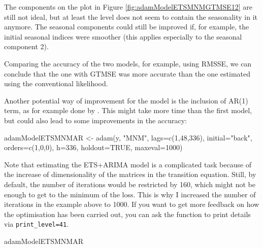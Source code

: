 \documentclass[
]{book}
\newenvironment{Shaded}{\begin{snugshade}}{\end{snugshade}}
\newcommand{\AttributeTok}[1]{\textcolor[rgb]{0.77,0.63,0.00}{#1}}
\newcommand{\ConstantTok}[1]{\textcolor[rgb]{0.00,0.00,0.00}{#1}}
\newcommand{\DecValTok}[1]{\textcolor[rgb]{0.00,0.00,0.81}{#1}}
\newcommand{\FunctionTok}[1]{\textcolor[rgb]{0.00,0.00,0.00}{#1}}
\newcommand{\NormalTok}[1]{#1}
\newcommand{\OtherTok}[1]{\textcolor[rgb]{0.56,0.35,0.01}{#1}}
\newcommand{\StringTok}[1]{\textcolor[rgb]{0.31,0.60,0.02}{#1}}
\theoremstyle{definition}
\theoremstyle{definition}
\theoremstyle{definition}
\theoremstyle{definition}
\theoremstyle{remark}
\begin{document}
The components on the plot in Figure \ref{fig:adamModelETSMNMGTMSE12} are still not ideal, but at least the level does not seem to contain the seasonality in it anymore. The seasonal components could still be improved if, for example, the initial seasonal indices were smoother (this applies especially to the seasonal component 2).

Comparing the accuracy of the two models, for example, using RMSSE, we can conclude that the one with GTMSE was more accurate than the one estimated using the conventional likelihood.

Another potential way of improvement for the model is the inclusion of AR(1) term, as for example done by \citet{Taylor2010}. This might take more time than the first model, but could also lead to some improvements in the accuracy:

\begin{Shaded}
\begin{Highlighting}[]
\NormalTok{adamModelETSMNMAR }\OtherTok{\textless{}{-}} \FunctionTok{adam}\NormalTok{(y, }\StringTok{"MNM"}\NormalTok{, }\AttributeTok{lags=}\FunctionTok{c}\NormalTok{(}\DecValTok{1}\NormalTok{,}\DecValTok{48}\NormalTok{,}\DecValTok{336}\NormalTok{),}
                          \AttributeTok{initial=}\StringTok{"back"}\NormalTok{, }\AttributeTok{orders=}\FunctionTok{c}\NormalTok{(}\DecValTok{1}\NormalTok{,}\DecValTok{0}\NormalTok{,}\DecValTok{0}\NormalTok{),}
                          \AttributeTok{h=}\DecValTok{336}\NormalTok{, }\AttributeTok{holdout=}\ConstantTok{TRUE}\NormalTok{, }\AttributeTok{maxeval=}\DecValTok{1000}\NormalTok{)}
\end{Highlighting}
\end{Shaded}

Note that estimating the ETS+ARIMA model is a complicated task because of the increase of dimensionality of the matrices in the transition equation. Still, by default, the number of iterations would be restricted by 160, which might not be enough to get to the minimum of the loss. This is why I increased the number of iterations in the example above to 1000. If you want to get more feedback on how the optimisation has been carried out, you can ask the function to print details via \texttt{print\_level=41}.

\begin{Shaded}
\begin{Highlighting}[]
\NormalTok{adamModelETSMNMAR}
\end{Highlighting}
\end{Shaded}
\end{document}
